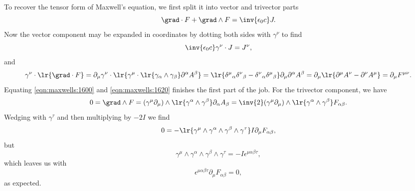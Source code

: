 {To recover the tensor form of Maxwell's equation, we first split it into vector and trivector parts
\begin{dmath}\label{eqn:maxwells:1580}
\grad \cdot F + \grad \wedge F = \inv{\epsilon_0 c} J.
\end{dmath}
Now the vector component may be expanded in coordinates by dotting both sides with \( \gamma^\nu \) to find
\begin{dmath}\label{eqn:maxwells:1600}
\inv{\epsilon_0 c} \gamma^\nu \cdot J = J^\nu,
\end{dmath}
and
\begin{dmath}\label{eqn:maxwells:1620}
\gamma^\nu \cdot
\lr{ \grad \cdot F }
=
\partial_\mu \gamma^\nu \cdot \lr{ \gamma^\mu \cdot \lr{ \gamma_\alpha \wedge \gamma_\beta } \partial^\alpha A^\beta }
=
\lr{
   {\delta^\mu}_\alpha
   {\delta^\nu}_\beta
   -
   {\delta^\nu}_\alpha
   {\delta^\mu}_\beta
}
\partial_\mu
\partial^\alpha A^\beta
=
\partial_\mu
\lr{
   \partial^\mu A^\nu
   -
   \partial^\nu A^\mu
}
=
\partial_\mu F^{\mu\nu}.
\end{dmath}
Equating \cref{eqn:maxwells:1600} and \cref{eqn:maxwells:1620} finishes the first part of the job.  For the trivector component, we have
\begin{dmath}\label{eqn:maxwells:1640}
0
= \grad \wedge F
= (\gamma^\mu \partial_\mu) \wedge \lr{ \gamma^\alpha \wedge \gamma^\beta } \partial_\alpha A_\beta
= \inv{2} (\gamma^\mu \partial_\mu) \wedge \lr{ \gamma^\alpha \wedge \gamma^\beta } F_{\alpha \beta}.
\end{dmath}
Wedging with \( \gamma^\tau \) and then multiplying by \( -2 I \) we find
\begin{dmath}\label{eqn:maxwells:1660}
0 = - \lr{ \gamma^\mu \wedge \gamma^\alpha \wedge \gamma^\beta \wedge \gamma^\tau } I \partial_\mu F_{\alpha \beta},
\end{dmath}
but
\begin{dmath}\label{eqn:maxwells:1680}
\gamma^\mu \wedge \gamma^\alpha \wedge \gamma^\beta \wedge \gamma^\tau = -I \epsilon^{\mu \alpha \beta \tau},
\end{dmath}
which leaves us with
\begin{dmath}\label{eqn:maxwells:1700}
\epsilon^{\mu \alpha \beta \tau}  \partial_\mu F_{\alpha \beta} = 0,
\end{dmath}
as expected.
} %
